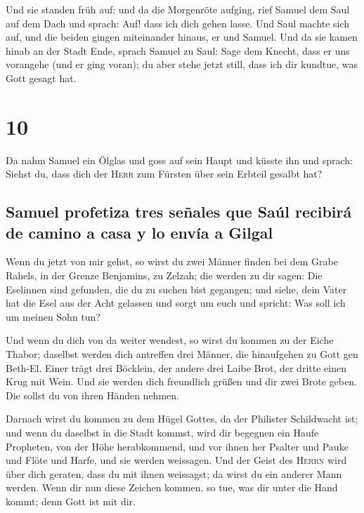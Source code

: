  Und sie standen früh auf; und da die Morgenröte aufging,
rief Samuel dem Saul auf dem Dach und sprach: Auf! dass ich dich gehen
lasse. Und Saul machte sich auf, und die beiden gingen miteinander
hinaus, er und Samuel.  Und da sie kamen hinab an der
Stadt Ende, sprach Samuel zu Saul: Sage dem Knecht, dass er uns
vorangehe (und er ging voran); du aber stehe jetzt still, dass ich dir
kundtue, was Gott gesagt hat.

\hypertarget{section-9}{%
\section{10}\label{section-9}}

 Da nahm Samuel ein Ölglas und goss auf sein Haupt und
küsste ihn und sprach: Siehst du, dass dich der \textsc{Herr} zum
Fürsten über sein Erbteil gesalbt hat?

\hypertarget{samuel-profetiza-tres-seuxf1ales-que-sauxfal-recibiruxe1-de-camino-a-casa-y-lo-envuxeda-a-gilgal}{%
\subsection{Samuel profetiza tres señales que Saúl recibirá de camino a
casa y lo envía a
Gilgal}\label{samuel-profetiza-tres-seuxf1ales-que-sauxfal-recibiruxe1-de-camino-a-casa-y-lo-envuxeda-a-gilgal}}

 Wenn du jetzt von mir gehst, so wirst du zwei Männer
finden bei dem Grabe Rahels, in der Grenze Benjamins, zu Zelzah; die
werden zu dir sagen: Die Eselinnen sind gefunden, die du zu suchen bist
gegangen; und siehe, dein Vater hat die Esel aus der Acht gelassen und
sorgt um euch und spricht: Was soll ich um meinen Sohn tun?

 Und wenn du dich von da weiter wendest, so wirst du
kommen zu der Eiche Thabor; daselbst werden dich antreffen drei Männer,
die hinaufgehen zu Gott gen Beth-El. Einer trägt drei Böcklein, der
andere drei Laibe Brot, der dritte einen Krug mit Wein. 
Und sie werden dich freundlich grüßen und dir zwei Brote geben. Die
sollst du von ihren Händen nehmen.

 Darnach wirst du kommen zu dem Hügel Gottes, da der
Philister Schildwacht ist; und wenn du daselbst in die Stadt kommst,
wird dir begegnen ein Haufe Propheten, von der Höhe herabkommend, und
vor ihnen her Psalter und Pauke und Flöte und Harfe, und sie werden
weissagen.  Und der Geist des \textsc{Herrn} wird über
dich geraten, dass du mit ihnen weissagst; da wirst du ein anderer Mann
werden.  Wenn dir nun diese Zeichen kommen, so tue, was
dir unter die Hand kommt; denn Gott ist mit dir.

